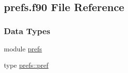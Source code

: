\hypertarget{prefs_8f90}{\subsection{prefs.\-f90 File Reference}
\label{prefs_8f90}
}
\subsubsection*{Data Types}
\begin{DoxyCompactItemize}
\item 
module \hyperlink{classprefs}{prefs}
\item 
type \hyperlink{structprefs_1_1pref}{prefs\-::pref}
\end{DoxyCompactItemize}
